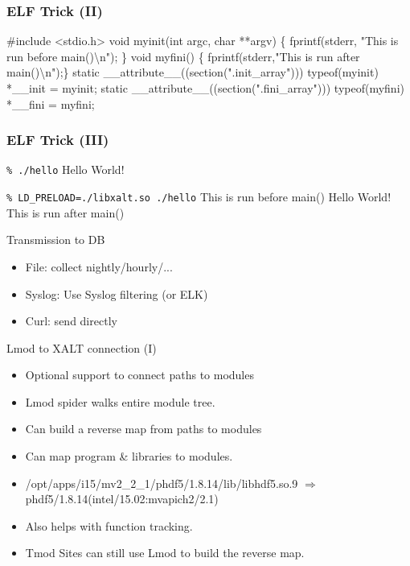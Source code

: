 \documentclass{beamer}
\begin{document}
\begin{frame}[fragile]
    \frametitle{ELF Trick (II)}
 {\small
    \begin{semiverbatim}
  #include <stdio.h>
  void myinit(int argc, char **argv)
  \{ fprintf(stderr, "This is run before main()\textbackslash{}n"); \}
  void myfini()
  \{ fprintf(stderr,"This is run after main()\textbackslash{}n");\}
  static \_\_attribute\_\_((section(".init_array")))
       typeof(myinit) *\_\_init = myinit;
  static \_\_attribute\_\_((section(".fini_array")))
       typeof(myfini) *\_\_fini = myfini;
    \end{semiverbatim}
}
\end{frame}

\begin{frame}[fragile]
    \frametitle{ELF Trick (III)}
 {\small
    \begin{semiverbatim}
        \texttt{\% ./hello}
        Hello World!

        \texttt{\% LD\_PRELOAD=./libxalt.so ./hello}
        This is run before main()
        Hello World!
        This is run after main()
    \end{semiverbatim}
}
\end{frame}

\begin{frame}{Transmission to DB}
  \begin{itemize}
    \item File: collect nightly/hourly/...
    \item Syslog: Use Syslog filtering (or ELK)
    \item Curl: send directly 
  \end{itemize}
\end{frame}

\begin{frame}{Lmod to XALT connection (I)}
  \begin{itemize}
    \item Optional support to connect paths to modules
    \item Lmod spider walks entire module tree.
    \item Can build a reverse map from paths to modules
    \item Can map program \& libraries to modules.
    \item /opt/apps/i15/mv2\_2\_1/phdf5/1.8.14/lib/libhdf5.so.9
      $\Rightarrow$ phdf5/1.8.14(intel/15.02:mvapich2/2.1)
    \item Also helps with function tracking.
    \item Tmod Sites can still use Lmod to build the reverse map.
  \end{itemize}
\end{frame}
\end{document}
